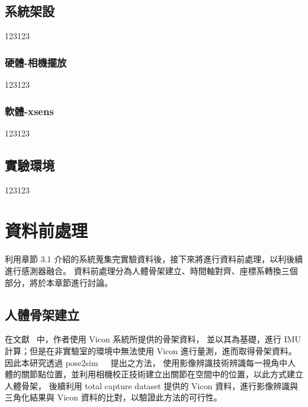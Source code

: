 \subsection{系統架設}
123123
\subsubsection{硬體-相機擺放}
123123
\subsubsection{軟體-xsens}
123123

\subsection{實驗環境}
123123

\section{資料前處理}
利用章節 3.1 介紹的系統蒐集完實驗資料後，接下來將進行資料前處理，以利後續進行感測器融合。
資料前處理分為人體骨架建立、時間軸對齊、座標系轉換三個部分，將於本章節進行討論。

\subsection{人體骨架建立}
在文獻~\cite{zhang2020fusing} 中，作者使用 Vicon 系統所提供的骨架資料，
並以其為基礎，進行 IMU 計算；但是在非實驗室的環境中無法使用 Vicon 進行量測，進而取得骨架資料。
因此本研究透過 pose2sim~\cite{Pagnon_2021_Robustness}~\cite{Pagnon_2022_Accuracy}~\cite{Pagnon_2022_JOSS}提出之方法，
使用影像辨識技術辨識每一視角中人體的關節點位置，並利用相機校正技術建立出關節在空間中的位置，以此方式建立人體骨架，
後續利用 total capture dataset 提供的 Vicon 資料，進行影像辨識與三角化結果與 Vicon 資料的比對，以驗證此方法的可行性。

